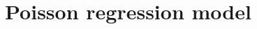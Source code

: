 \documentclass[12pt]{article}
\def\E{\mathrm{E}}
\begin{document}
\section{Poisson regression model}
\end{document}
